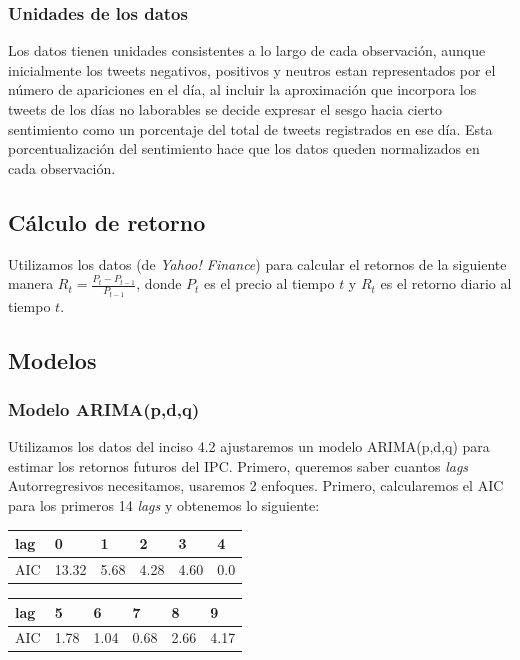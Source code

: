 \documentclass[12pt,reqno,letter]{article}
\begin{document}
\begin{multicols}{2}
\subsubsection{Unidades de los datos}

    Los datos tienen unidades consistentes a lo largo de cada observación, aunque inicialmente los tweets negativos, positivos y neutros estan representados por el número de apariciones en el día, al incluir la aproximación que incorpora los tweets de los días no laborables se decide expresar el sesgo hacia cierto sentimiento como un porcentaje del total de tweets registrados en ese día. Esta porcentualización del sentimiento hace que los datos queden normalizados en cada observación. 
    
		

\subsection{Cálculo de retorno}
		Utilizamos los datos (de \textit{Yahoo! Finance}) para calcular  el retornos de la siguiente manera $R_t=\frac{P_t-P_{t-1}}{P_{t-1}}$, donde $P_t$ es el precio al tiempo $t$ y $R_t$ es el retorno diario al tiempo $t$. 
\subsection{Modelos}
\subsubsection{Modelo ARIMA(p,d,q)}		
		Utilizamos los datos del inciso 4.2 ajustaremos un modelo ARIMA(p,d,q) para estimar los retornos futuros del IPC. 
		Primero, queremos saber cuantos \textit{lags} Autorregresivos necesitamos, usaremos 2 enfoques. Primero, calcularemos el AIC para los primeros 14 \textit{lags} y obtenemos lo siguiente:

\begin{center}
\begin{tabular}{llllll}
lag & 0     & 1    & 2    & 3    & 4    \\
\hline
AIC & 13.32 & 5.68 & 4.28 & 4.60 & 0.0 
\end{tabular}
\end{center}

\begin{center}
\begin{tabular}{llllll}
lag & 5     & 6    & 7    & 8    & 9    \\
\hline
AIC & 1.78 & 1.04 & 0.68 & 2.66 & 4.17 
\end{tabular}
\end{center}


\end{multicols}
\end{document}

